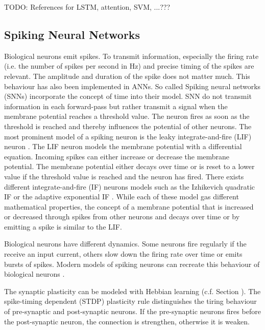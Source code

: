 TODO: References for LSTM, attention, SVM, ...???


\subsection{Spiking Neural Networks}
Biological neurons emit spikes.
To transmit information, especially the firing rate (i.e. the number of spikes per second in Hz) and precise timing of the spikes are relevant.
The amplitude and duration of the spike does not matter much.
This behaviour has also been implemented in ANNs.
So called Spiking neural networks (SNNs) incorporate the concept of time into their model.
SNN do not transmit information in each forward-pass but rather transmit a signal when the membrane potential reaches a threshold value. 
The neuron fires as soon as the threshold is reached and thereby influences the potential of other neurons.
The most prominent model of a spiking neuron is the leaky integrate-and-fire (LIF) neuron .
The LIF neuron models the membrane potential with a differential equation.
Incoming spikes can either increase or decrease the membrane potential.
The membrane potential either decays over time or is reset to a lower value if the threshold value is reached and the neuron has fired.
There exists different integrate-and-fire (IF) neurons models such as the Izhikevich quadratic IF  or the adaptive exponential IF .
While each of these model gas different mathematical properties, the concept of a membrane potential that is increased or decreased through spikes from other neurons and decays over time or by emitting a spike is similar to the LIF.

Biological neurons have different dynamics.
Some neurons fire regularly if the receive an input current, others slow down the firing rate over time or emits bursts of spikes.
Modern models of spiking neurons can recreate this behaviour of biological neurons .

The synaptic plasticity can be modeled with Hebbian learning (c.f. Section ).
The spike-timing dependent (STDP) plasticity rule  distinguishes the tiring behaviour of pre-synaptic and post-synaptic neurons.
If the pre-synaptic neurons fires before the post-synaptic neuron, the connection is strengthen, otherwise it is weaken.

